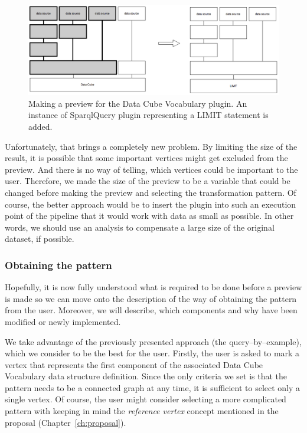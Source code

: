 \begin{figure}
	\centering
	\includegraphics[width=140mm]{img/dcv-extraction-limit.png}
	\caption{Making a preview for the Data Cube Vocabulary plugin. An instance of
	SparqlQuery plugin representing a LIMIT statement is added.}
	\label{fig:dcv-extraction-limit}
\end{figure}

Unfortunately, that brings a completely new problem. By limiting the size of 
the result, it is possible that some important vertices might get excluded from the preview.
And there is no way of 
telling, which vertices could be important to the user. Therefore, we made the 
size of the preview to be a variable that could be changed before making the preview and 
selecting the transformation pattern. Of course, the better approach would be to 
insert the plugin into such an execution point of the pipeline that it would 
work with data as small as possible. In other words, we should use an analysis 
to compensate a large size of the original dataset, if possible.



\subsubsection{Obtaining the pattern}
Hopefully, it is now fully understood what is required to be done before a preview 
is made so we can move onto the description of the way of obtaining the pattern 
from the user. Moreover, we will describe, which components and why have been 
modified or newly implemented.

\begin{sloppypar}
We take advantage of the previously presented approach (the query--by--example), which we 
consider to be the best for the user. Firstly, the user is asked to mark a vertex that represents
the first component of the associated Data Cube Vocabulary data structure 
definition. Since the only criteria we set is that the pattern needs to be a 
connected graph at any time, it is sufficient to select only a single vertex.
Of course, the user might consider selecting a more complicated pattern with keeping in mind the 
\emph{reference vertex} concept mentioned in the proposal (Chapter~\ref{ch:proposal}).
\end{sloppypar}

